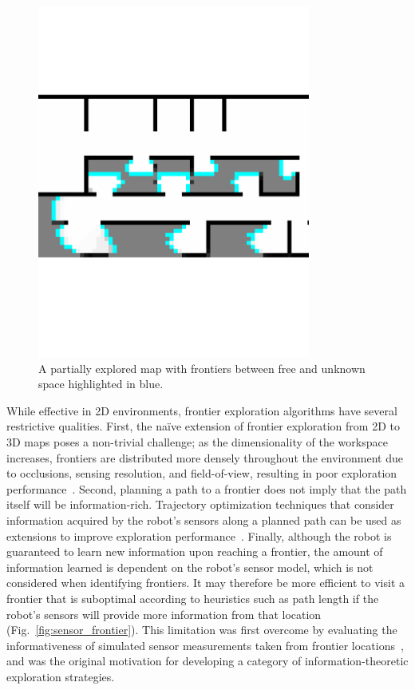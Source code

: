 \begin{figure}[t]
  \centering
  \includegraphics[trim=0cm 0.4cm 0.1cm 0.1cm, clip, width=0.8\textwidth]{frontiers.pdf}
  \caption[Frontiers in a partially explored map.]{A partially explored map with frontiers between free and unknown
  space highlighted in blue.\label{fig:frontiers}}
\end{figure}

While effective in 2D environments, frontier exploration algorithms have
several restrictive qualities. First, the na\"{i}ve extension of frontier exploration
from 2D to 3D maps poses a non-trivial challenge; as the
dimensionality of the workspace increases, frontiers are distributed more
densely throughout the environment due to occlusions, sensing resolution, and
field-of-view, resulting in poor exploration performance~\cite{shen20113d}.
Second, planning a path to a frontier does not imply that the path
itself will be information-rich. Trajectory optimization techniques that
consider information acquired by the robot's sensors along a planned path can be used
as extensions to improve exploration performance~\cite{sim2004online,kollar2008trajectory}.
Finally, although the robot is guaranteed to learn new information upon reaching a
frontier, the amount of information learned is dependent on the
robot's sensor model, which is not considered when identifying frontiers.
It may therefore be more efficient to visit a frontier that is
suboptimal according to heuristics such as path length if the robot's sensors
will provide more information from that location
(Fig.~\ref{fig:sensor_frontier}).
This limitation was first overcome by evaluating the informativeness of simulated
sensor measurements taken from frontier locations~\cite{gonzalez2002navigation}, and was the
original motivation for developing a category of information-theoretic exploration strategies.

